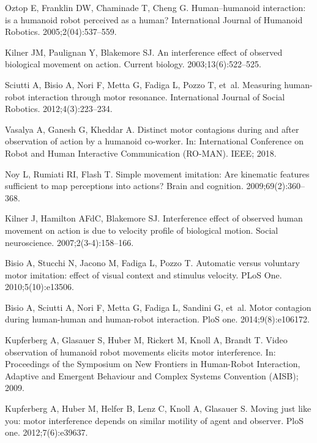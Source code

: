 \begin{thebibliography}{10}
	Oztop E, Franklin DW, Chaminade T, Cheng G.
	\newblock Human--humanoid interaction: is a humanoid robot perceived as a
	human?
	\newblock International Journal of Humanoid Robotics. 2005;2(04):537--559.
	
	Kilner JM, Paulignan Y, Blakemore SJ.
	\newblock An interference effect of observed biological movement on action.
	\newblock Current biology. 2003;13(6):522--525.
	
	Sciutti A, Bisio A, Nori F, Metta G, Fadiga L, Pozzo T, et~al.
	\newblock Measuring human-robot interaction through motor resonance.
	\newblock International Journal of Social Robotics. 2012;4(3):223--234.
	
	Vasalya A, Ganesh G, Kheddar A.
	\newblock Distinct motor contagions during and after observation of action by a
	humanoid co-worker.
	\newblock In: International Conference on Robot and Human Interactive
	Communication (RO-MAN). IEEE; 2018.
	
	Noy L, Rumiati RI, Flash T.
	\newblock Simple movement imitation: Are kinematic features sufficient to map
	perceptions into actions?
	\newblock Brain and cognition. 2009;69(2):360--368.
	
	Kilner J, Hamilton AFdC, Blakemore SJ.
	\newblock Interference effect of observed human movement on action is due to
	velocity profile of biological motion.
	\newblock Social neuroscience. 2007;2(3-4):158--166.
	
	Bisio A, Stucchi N, Jacono M, Fadiga L, Pozzo T.
	\newblock Automatic versus voluntary motor imitation: effect of visual context
	and stimulus velocity.
	\newblock PLoS One. 2010;5(10):e13506.
	
	Bisio A, Sciutti A, Nori F, Metta G, Fadiga L, Sandini G, et~al.
	\newblock Motor contagion during human-human and human-robot interaction.
	\newblock PloS one. 2014;9(8):e106172.
	
	Kupferberg A, Glasauer S, Huber M, Rickert M, Knoll A, Brandt T.
	\newblock Video observation of humanoid robot movements elicits motor
	interference.
	\newblock In: Proceedings of the Symposium on New Frontiers in Human-Robot
	Interaction, Adaptive and Emergent Behaviour and Complex Systems Convention
	(AISB); 2009.
	
	Kupferberg A, Huber M, Helfer B, Lenz C, Knoll A, Glasauer S.
	\newblock Moving just like you: motor interference depends on similar motility
	of agent and observer.
	\newblock PloS one. 2012;7(6):e39637.
	

\end{thebibliography}
